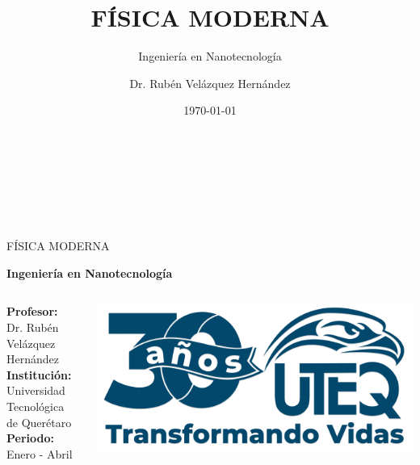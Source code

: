 \documentclass[aspectratio=169]{beamer} %
\title{\textbf{FÍSICA MODERNA}}
\subtitle{Ingeniería en Nanotecnología}
\author{Dr. Rubén Velázquez Hernández}
\date{\today}
\institute{Universidad Tecnológica de Querétaro}
\begin{document}
	
	\begin{frame}
		\vspace*{2cm} %
		\begin{center}
			{\Large\bfseries\textcolor{uteqDarkBlue}{\inserttitle}}\\[0.5cm]
			{\large\textcolor{uteqDarkBlue}{\insertsubtitle}}\\[1cm]
			{\normalsize\textcolor{uteqDarkBlue}{\insertauthor}}\\[0.3cm]
			{\small\textcolor{uteqDarkBlue}{\insertinstitute}}\\[0.3cm]
			{\small\textcolor{uteqDarkBlue}{\insertdate}}
		\end{center}
	\end{frame}
	
	\begin{frame}{FÍSICA MODERNA}
		\vspace{0.5cm}
		\begin{center}
			{\large\textbf{Ingeniería en Nanotecnología}}\\[1.5cm]
			
			\begin{columns}
				\begin{column}{0.6\textwidth}
					{\normalsize\textbf{Profesor:}}\\
					Dr. Rubén Velázquez Hernández\\[0.5cm]
					
					{\normalsize\textbf{Institución:}}\\
					Universidad Tecnológica de Querétaro\\[0.5cm]
					
					{\normalsize\textbf{Periodo:}}\\
					Enero - Abril \the\year
				\end{column}
				
				\begin{column}{0.35\textwidth}
					\includegraphics[width=\textwidth]{logo-uteq.png}
				\end{column}
			\end{columns}
		\end{center}
	\end{frame}
	
\end{document}
